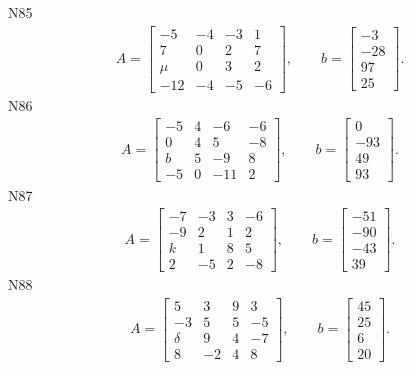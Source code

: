 \documentclass[11pt]{report}
\begin{document}
N85
\begin{align*}
 A = \left[\begin{matrix}-5 & -4 & -3 & 1\\7 & 0 & 2 & 7\\\mu & 0 & 3 & 2\\-12 & -4 & -5 & -6\end{matrix}\right],
\qquad b = \left[\begin{matrix}-3\\-28\\97\\25\end{matrix}\right]. 
 \end{align*}
N86
\begin{align*}
 A = \left[\begin{matrix}-5 & 4 & -6 & -6\\0 & 4 & 5 & -8\\b & 5 & -9 & 8\\-5 & 0 & -11 & 2\end{matrix}\right],
\qquad b = \left[\begin{matrix}0\\-93\\49\\93\end{matrix}\right]. 
 \end{align*}
N87
\begin{align*}
 A = \left[\begin{matrix}-7 & -3 & 3 & -6\\-9 & 2 & 1 & 2\\k & 1 & 8 & 5\\2 & -5 & 2 & -8\end{matrix}\right],
\qquad b = \left[\begin{matrix}-51\\-90\\-43\\39\end{matrix}\right]. 
 \end{align*}
N88
\begin{align*}
 A = \left[\begin{matrix}5 & 3 & 9 & 3\\-3 & 5 & 5 & -5\\\delta & 9 & 4 & -7\\8 & -2 & 4 & 8\end{matrix}\right],
\qquad b = \left[\begin{matrix}45\\25\\6\\20\end{matrix}\right]. 
 \end{align*}
\end{document}
